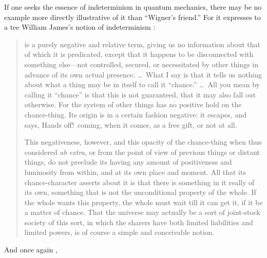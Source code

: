 \documentclass[aps,pra,superscriptaddress,10pt,tightenlines,twocolumn,nofootinbib]{revtex4}
\begin{document}
If one seeks the essence of indeterminism in quantum mechanics, there may be no example more directly illustrative of it than ``Wigner's friend.''  For it expresses to a tee William James's notion of indeterminism \cite{James1884}:
\begin{quote}
\noindent [Chance] is a purely negative and relative term, giving us no
information about that of which it is predicated, except that it
happens to be disconnected with something else---not controlled,
secured, or necessitated by other things in advance of its own actual
presence. \ldots\ What I say is that it tells us
nothing about what a thing may be in itself to call it ``chance.'' \ldots\
All you mean by calling it ``chance'' is that this is not guaranteed,
that it may also fall out otherwise. For the system of other things
has no positive hold on the chance-thing. Its origin is in a certain
fashion negative: it escapes, and says, Hands off!\ coming, when it
comes, as a free gift, or not at all.

This negativeness, however, and this opacity of the chance-thing when
thus considered {\it ab extra}, or from the point of view of previous
things or distant things, do not preclude its having any amount of
positiveness and luminosity from within, and at its own place and
moment. All that its chance-character asserts about it is that there
is something in it really of its own, something that is not the
unconditional property of the whole. If the whole wants this
property, the whole must wait till it can get it, if it be a matter
of chance. That the universe may actually be a sort of joint-stock
society of this sort, in which the sharers have both limited
liabilities and limited powers, is of course a simple and conceivable
notion.
\end{quote}
And once again \cite{JamesOSH},
\end{document}
